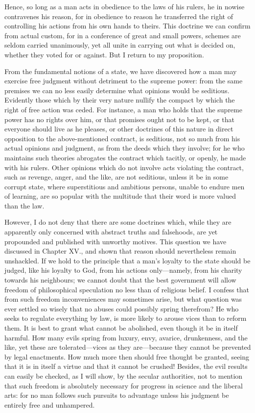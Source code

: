 Hence, so long as a man acts in obedience to the laws of his rulers,
he in nowise contravenes his reason, for in obedience to reason he
transferred the right of controlling his actions from his own hands to
theirs. This doctrine we can confirm from actual custom, for in a
conference of great and small powers, schemes are seldom carried
unanimously, yet all unite in carrying out what is decided on, whether
they voted for or against. But I return to my proposition.

From the fundamental notions of a state, we have discovered how a man
may exercise free judgment without detriment to the supreme power:
from the same premises we can no less easily determine what opinions
would be seditious. Evidently those which by their very nature nullify
the compact by which the right of free action was ceded. For instance,
a man who holds that the supreme power has no rights over him, or that
promises ought not to be kept, or that everyone should live as he
pleases, or other doctrines of this nature in direct opposition to the
above-mentioned contract, is seditious, not so much from his actual
opinions and judgment, as from the deeds which they involve; for he
who maintains such theories abrogates the contract which tacitly, or
openly, he made with his rulers. Other opinions which do not involve
acts violating the contract, such as revenge, anger, and the like, are
not seditious, unless it be in some corrupt state, where superstitious
and ambitious persons, unable to endure men of  learning,
are so popular with the multitude that their word is more valued than
the law.

However, I do not deny that there are some doctrines which, while they
are apparently only concerned with abstract truths and falsehoods, are
yet propounded and published with unworthy motives. This question we
have discussed in Chapter XV., and shown that reason should
nevertheless remain unshackled. If we hold to the principle that a
man's loyalty to the state should be judged, like his loyalty to God,
from his actions on\-ly---name\-ly, from his charity towards his
neighbours; we cannot doubt that the best government will allow
freedom of philosophical speculation no less than of religious belief.
I confess that from such freedom inconveniences may sometimes arise,
but what question was ever settled so wisely that no abuses could
possibly spring therefrom? He who seeks to regulate everything by law,
is more likely to arouse vices than to reform them. It is best to
grant what cannot be abolished, even though it be in itself harmful.
How many evils spring from luxury, envy, avarice, drunkenness, and the
like, yet these are tol\-er\-at\-ed---vices as they are---be\-cause
they cannot be prevented by legal enactments. How much more then
should free thought be granted, seeing that it is in itself a virtue
and that it cannot be crushed! Besides, the evil results can easily be
checked, as I will show, by the secular authorities, not to mention
that such freedom is absolutely necessary for progress in science and
the liberal arts: for no man follows such pursuits to advantage unless
his judgment be entirely free and unhampered.


